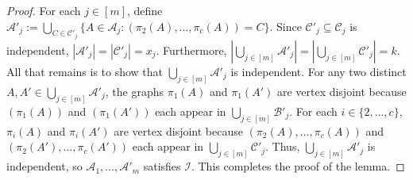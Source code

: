 \documentclass{patmorin}
\newcommand{\pat}[1]{\textcolor{Blue}{[Pat: #1]}}
\DeclarePairedDelimiter\set{\{}{\}}
\renewcommand{\mid}{:}  %
\begin{document}
\begin{proof}
For each $j\in[m]$, define $\mathcal{A}'_j:=\bigcup_{C\in\mathcal{C}'_j}\{A\in\mathcal{A}_j\mid (\pi_2(A),\ldots,\pi_c(A))=C\}$.  Since $\mathcal{C}'_j\subseteq\mathcal{C}_j$ is independent,  $|\mathcal{A}'_j|=|\mathcal{C}'_j|=x_j$.
Furthermore, $|\bigcup_{j\in[m]}\mathcal{A}'_j|=|\bigcup_{j\in[m]}\mathcal{C}'_j|=k$.
All that remains is to show that $\bigcup_{j\in[m]}\mathcal{A}'_j$ is independent.
For any two distinct $A,A'\in\bigcup_{j\in[m]}\mathcal{A}'_j$, the graphs $\pi_1(A)$ and $\pi_1(A')$ are vertex disjoint because $(\pi_1(A))$ and $(\pi_1(A'))$ each appear in $\bigcup_{j\in[m]}\mathcal{B}'_j$.  For each $i\in\{2,\ldots,c\}$, $\pi_i(A)$ and $\pi_i(A')$ are vertex disjoint because $(\pi_2(A),\ldots,\pi_c(A))$ and
$(\pi_2(A'),\ldots,\pi_c(A'))$ each appear in $\bigcup_{j\in[m]}\mathcal{C}'_j$.  Thus, $\bigcup_{j\in[m]}\mathcal{A}'_j$ is independent, so $\mathcal{A}_1,\ldots,\mathcal{A}'_m$ satisfies $\mathcal{I}$.
This completes the proof of the lemma.
\end{proof}




\end{document}
